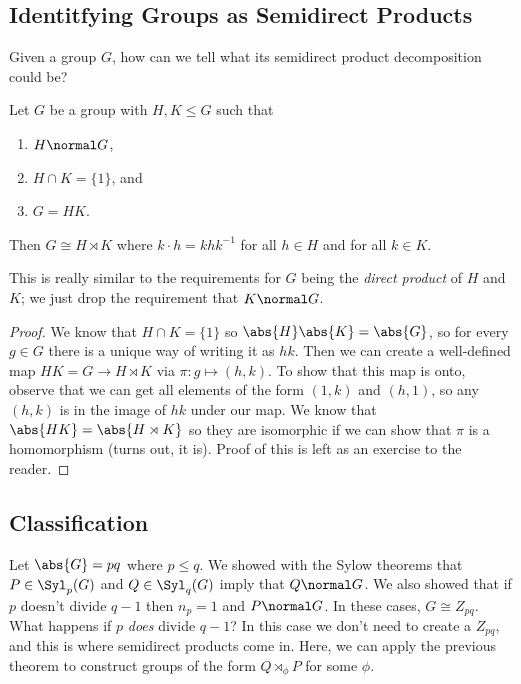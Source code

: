 \subsection{Identitfying Groups as Semidirect Products}

Given a group $G$, how can we tell what its semidirect product decomposition could be?

\begin{theorem}
Let $G$ be a group with $H,K \leq G$ such that 
\begin{enumerate}
\item $H \normal G$,
\item $H \cap K = \{1\}$, and 
\item $G = HK$.
\end{enumerate}
Then $G \cong H \rtimes K$ where $k \cdot h = khk^{-1}$ for all $h \in H$ and for all $k \in K$.
\end{theorem}

This is really similar to the requirements for $G$ being the \emph{direct product} of $H$ and $K$; we just drop the requirement that $K \normal G$.

\begin{proof}
We know that $H \cap K = \{1\}$ so $\abs{H}\abs{K} = \abs{G}$, so for every $g \in G$ there is a unique way of writing it as $hk$. Then we can create a well-defined map $HK = G \to H \rtimes K$ via $\pi : g \mapsto (h,k)$. To show that this map is onto, observe that we can get all elements of the form $(1,k)$ and $(h,1)$, so any $(h,k)$ is in the image of $hk$ under our map. We know that $\abs{HK} = \abs{H \rtimes K}$ so they are isomorphic if we can show that $\pi$ is a homomorphism (turns out, it is). Proof of this is left as an exercise to the reader.
\end{proof}

\subsection{Classification}

Let $\abs{G} = pq$ where $p \leq q$. We showed with the Sylow theorems that $P \in \Syl_p(G)$ and $Q \in \Syl_q(G)$ imply that $Q \normal G$. We also showed that if $p$ doesn't divide $q - 1$ then $n_p = 1$ and $P \normal G$. In these cases, $G \cong Z_{pq}$. What happens if $p$ \emph{does} divide $q-1$? In this case we don't need to create a $Z_{pq}$, and this is where semidirect products come in. Here, we can apply the previous theorem to construct groups of the form $Q \rtimes_\phi P$ for some $\phi$.

